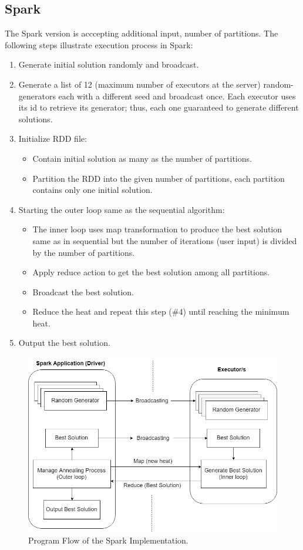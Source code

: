 \documentclass{article}
\begin{document}
		\subsection{Spark} \label{D_SPARK}
		The Spark version is acccepting additional input, number of partitions. The following steps illustrate execution process in Spark:
		\begin{enumerate}
		\item Generate initial solution randomly and broadcast.
		\item Generate a list of 12 (maximum number of executors at the server) random-generators each with a different seed and broadcast once. Each executor uses its id to retrieve its generator; thus, each one guaranteed to generate different solutions.
		\item Initialize RDD file:
		\begin{itemize} 
			\item Contain initial solution as many as the number of partitions.
			\item Partition the RDD into the given number of partitions, each partition contains only one initial solution.
		\end{itemize}
		\item Starting the outer loop same as the sequential algorithm:
		\begin{itemize} 
			\item The inner loop uses map transformation to produce the best solution same as in sequential but the number of iterations (user input) is divided by the number of partitions.
		    \item Apply reduce action to get the best solution among all partitions.
		    \item Broadcast the best solution.
		    \item Reduce the heat and repeat this step (\#4) until reaching the minimum heat.
		\end{itemize}
		\item Output the best solution.
		\end{enumerate}

		\begin{figure}\label{F1}
			\caption{Program Flow of the Spark Implementation.}
			\centering
			\includegraphics[scale=0.45]{spark_flow_diagram.png}
		\end{figure}
		
\end{document}
